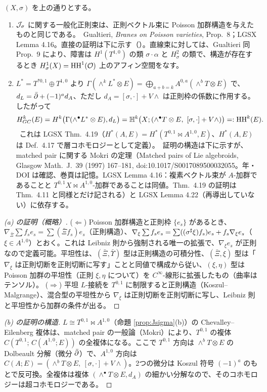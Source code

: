 \begin{prop}[一般化正則束 $=$ Poisson 加群、および Dolbeault モデル]\label{prop:ident}
$(X,\sigma)$ を上の通りとする。
\begin{enumerate}
\item[(a)] $\mathcal J_\sigma$ に関する一般化正則束は、正則ベクトル束に Poisson 加群構造を与えたものと同じである。\tC\ Gualtieri, \emph{Branes on Poisson varieties}, Prop.\ 8；LGSX Lemma 4.16。直接の証明は下に示す（\tP）。直線束に対しては、Gualtieri 同 Prop.\ 9 により、障害は $H^1(T^{1,0})$ の類 $\sigma\cdot\alpha$ と $H^2_\sigma$ の類で、構造が存在するとき $H^1_\sigma(X)=\mathrm{HH}^1(\mathcal O)$ 上のアフィン空間をなす。\tC
\item[(b)] $L^*=T^{*0,1}\oplus T^{1,0}$ より $\Gamma(\wedge^kL^*\otimes E)=\bigoplus_{a+b=k}A^{0,a}(\wedge^bT\otimes E)$ で、$d_L=\bar\partial+(-1)^ad_A$、ただし $d_A=[\sigma,\cdot]+V\wedge$ は正則枠の係数に作用する。したがって
\[H^k_{GC}(E)=H^k\bigl(\Gamma(\wedge^\bullet L^*\otimes E),d_L\bigr)=\mathbb H^k\bigl(X;(\wedge^\bullet T\otimes E,\ [\sigma,\cdot]+V\wedge)\bigr)=:\HH^k(E).\]
\tC\ これは LGSX Thm.\ 4.19（$H^*(A,E)=H^*(T^{0,1}\bowtie A^{1,0},E)$、$H^*(A,E)$ は Def.\ 4.17 で層コホモロジーとして定義）。\tP\ 証明の構造は下に示すが、matched pair に関する Mokri の定理（Matched pairs of Lie algebroids, Glasgow Math.\ J.\ 39 (1997) 167--181, doi:10.1017/S0017089500032055。年・DOI は確認、巻頁は記憶\tQ。LGSX Lemma 4.16：複素ベクトル束が $A$-加群であることと $T^{0,1}X\bowtie A^{1,0}$-加群であることは同値。Thm.\ 4.19 の証明は Thm.\ 4.11 と同様とだけ記される）と LGSX Lemma 4.22（再導出していない）に依存する。
\end{enumerate}
\end{prop}
\begin{proof}[(a) の証明（概略）]
($\Leftarrow$) Poisson 加群構造と正則枠 $\{e_s\}$ があるとき、$\nabla_{\bar\Xi}\sum f_se_s=\sum(\bar\Xi f_s)e_s$（正則構造）、$\nabla_\xi\sum f_se_s=\sum((\sigma^\sharp\xi)f_s)e_s+f_s\nabla_\xi e_s$（$\xi\in A^{1,0}$）とおく。これは Leibniz 則から強制される唯一の拡張で、$\nabla_\xi e_s$ が正則なので定義可能。平坦性は、$(\bar\Xi,\bar\Upsilon)$ 型は正則構造の可積分性、$(\bar\Xi,\xi)$ 型は「$\nabla_\xi$ は正則切断を正則切断に写す」ことと同値で構成から従い、$(\xi,\eta)$ 型は Poisson 加群の平坦性（正則 $\xi,\eta$ について）を $C^\infty$-線形に拡張したもの（曲率はテンソル）。
($\Rightarrow$) 平坦 $L$-接続を $T^{0,1}$ に制限すると正則構造（Koszul--Malgrange）、混合型の平坦性から $\nabla_\xi$ は正則切断を正則切断に写し、Leibniz 則と平坦性から加群の条件が出る。\qedhere
\end{proof}
\begin{proof}[(b) の証明の構造]
$L\cong T^{0,1}\bowtie A^{1,0}$（命題 \ref{prop:Jsigma}(b)）の Chevalley--Eilenberg 複体は、matched pair の一般論（Mokri）により、$T^{0,1}$ の複体 $C(T^{0,1};\,C(A^{1,0};E))$ の全複体になる。ここで $T^{0,1}$ 方向は $\wedge^bT\otimes E$ の Dolbeault 分解（微分 $\bar\partial$）で、$A^{1,0}$ 方向は $C(A;E)=(\wedge^bT\otimes E,\ [\sigma,\cdot]+V\wedge)$。2つの微分は Koszul 符号 $(-1)^a$ のもとで反可換。全複体は複体 $(\wedge^\bullet T\otimes E,d_A)$ の細かい分解なので、そのコホモロジーは超コホモロジーである。\qedhere
\end{proof}

